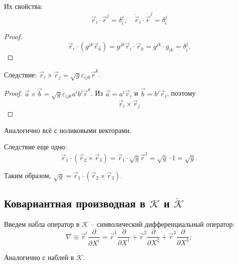 Их свойства:
\[
  \vec{r}_i \cdot \vec{r}^j = \delta^j_i, \quad \mathring{\vec{r}}_i \cdot \mathring{\vec{r}}^j = \delta^j_i
\]
\begin{proof}
  \[
    \vec{r}_i \cdot (g^{jk} \vec{r}_k)
    = g^{jk} \vec{r}_i \cdot \vec{r}_k
    = g^{jk} \cdot g_{ik} = \delta_i^j.
  \]
\end{proof}

Следствие: $\vec{r}_i \times \vec{r}_j = \sqrt{g} \varepsilon_{ijk} \vec{r}^k$.

\begin{proof}
  $\vec{a} \times \vec{b} = \sqrt{g} \varepsilon_{ijk} a^i b^j \vec{r}^k$.
  Из $\vec{a} = a^i \vec{r}_i$ и $\vec{b} = b^j \vec{r}_i$, поэтому 
  \[
    \vec{r}_i \times \vec{r}_j
  \]
\end{proof}

Аналогично всё с ноликовыми векторами.

Следствие еще одно:
\[
  \vec{r}_1 \cdot (\vec{r}_2 \times \vec{r}_3)
  = \vec{r}_1 \cdot \sqrt{g} \vec{r}^1
  = \sqrt{g} \cdot 1 = \sqrt{g}.
\]

Таким образом, $\sqrt{g} = \vec{r}_1 \cdot (\vec{r}_2 \times \vec{r}_3)$.


\subsection{Ковариантная производная в $\mathcal{K}$ и $\mathring{\mathcal{K}}$}

Введем набла оператор в $\mathcal{K}$ -- символический дифференциальный оператор:
\[
  \nabla \equiv \vec{r}^i \dfrac{\partial }{\partial X^i} 
  = \vec{r}^1 \dfrac{\partial }{\partial X^1} + \vec{r}^2 \dfrac{\partial }{\partial X^2} 
  + \vec{r}^3 \dfrac{\partial }{\partial X^3};
\]

Аналогично с наблей в $\mathring{\mathcal{K}}$.

